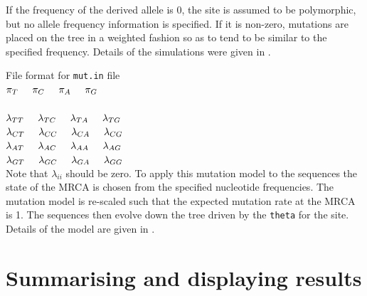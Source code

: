 \documentclass[a4paper,10pt,fullpage]{article}
\begin{document}
\noindent If the frequency of the derived allele is 0, the site is assumed to be polymorphic, but no allele frequency information is specified.  If it is non-zero, mutations are placed on the tree in a weighted fashion so as to tend to be similar to the specified frequency.  Details of the simulations were given in \cite{McVeanetal04}.


\vspace{1.0cm} \noindent File format for \verb+mut.in+ file\\

\noindent $\pi_T \hspace{0.5cm} \pi_C \hspace{0.5cm} \pi_A \hspace{0.5cm} \pi_G$ \\\\
$\lambda_{TT} \hspace{0.5cm} \lambda_{TC} \hspace{0.5cm} \lambda_{TA} \hspace{0.5cm} \lambda_{TG}$\\
$\lambda_{CT} \hspace{0.5cm} \lambda_{CC} \hspace{0.5cm} \lambda_{CA} \hspace{0.5cm} \lambda_{CG}$\\
$\lambda_{AT} \hspace{0.5cm} \lambda_{AC} \hspace{0.5cm} \lambda_{AA} \hspace{0.5cm} \lambda_{AG}$\\
$\lambda_{GT} \hspace{0.5cm} \lambda_{GC} \hspace{0.5cm} \lambda_{GA} \hspace{0.5cm} \lambda_{GG}$\\


\noindent Note that $\lambda_{ii}$ should be zero.  To apply this mutation model to the sequences the state of the MRCA is chosen from the specified nucleotide frequencies.  The mutation model is re-scaled such that the expected mutation rate at the MRCA is 1.  The sequences then evolve down the tree driven by the \verb+theta+ for the site.  Details of the model are given in \cite{McVeanetal02}.


\section{Summarising and displaying  results}
\end{document}
